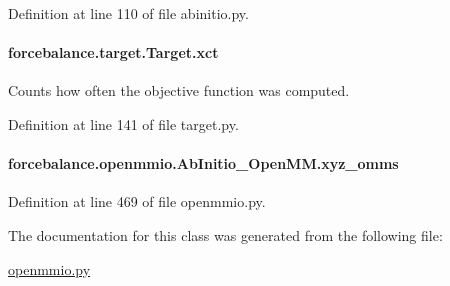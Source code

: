 Definition at line 110 of file abinitio.\-py.

\hypertarget{classforcebalance_1_1target_1_1Target_aad2e385cfbf7b4a68f1c2cb41133fe82}{
\paragraph[{xct}]{\setlength{\rightskip}{0pt plus 5cm}forcebalance.\-target.\-Target.\-xct\hspace{0.3cm}{\ttfamily [inherited]}}}\label{classforcebalance_1_1target_1_1Target_aad2e385cfbf7b4a68f1c2cb41133fe82}


Counts how often the objective function was computed. 



Definition at line 141 of file target.\-py.

\hypertarget{classforcebalance_1_1openmmio_1_1AbInitio__OpenMM_a355176032e08dff544b81a12d8e82a9e}{
\paragraph[{xyz\-\_\-omms}]{\setlength{\rightskip}{0pt plus 5cm}forcebalance.\-openmmio.\-Ab\-Initio\-\_\-\-Open\-M\-M.\-xyz\-\_\-omms}}\label{classforcebalance_1_1openmmio_1_1AbInitio__OpenMM_a355176032e08dff544b81a12d8e82a9e}


Definition at line 469 of file openmmio.\-py.



The documentation for this class was generated from the following file\-:\begin{DoxyCompactItemize}
\item 
\hyperlink{openmmio_8py}{openmmio.\-py}\end{DoxyCompactItemize}
